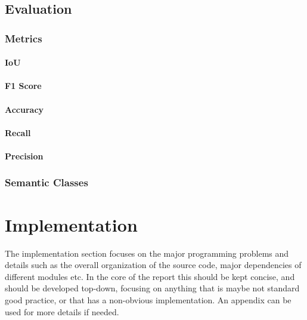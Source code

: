 \documentclass[11pt, a4paper,oneside,chapterprefix=false]{scrbook}
\begin{document}
\section{Evaluation}

\subsection{Metrics}

\subsubsection{IoU}

\subsubsection{F1 Score}

\subsubsection{Accuracy}

\subsubsection{Recall}

\subsubsection{Precision}

\subsection{Semantic Classes}

\chapter{Implementation} \label{chp:implementation}

The implementation section focuses on the major programming problems and details such as the overall organization of the source code, major dependencies of different modules etc. In the core of the report this should be kept concise, and should be developed top-down, focusing on anything that is maybe not standard good practice, or that has a non-obvious implementation. An appendix can be used for more details if needed.
\end{document}
